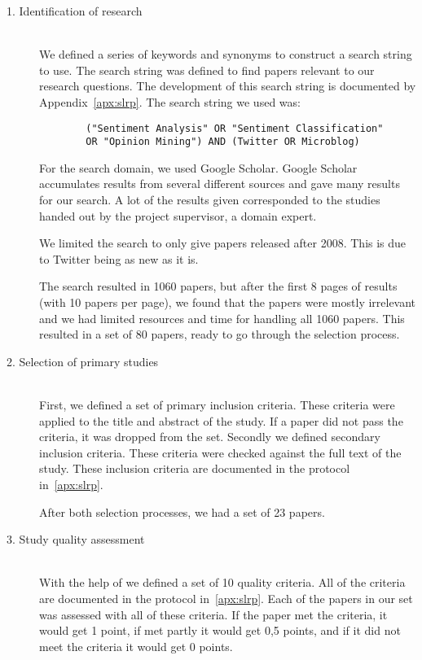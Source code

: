 \begin{description}

	\item[1. Identification of research] \hfill \\
		We defined a series of keywords and synonyms to construct a search string to use. The search string was defined to find papers relevant to our research questions. The development of this search string is documented by Appendix~\ref{apx:slrp}. The search string we used was:
		
		\begin{verbatim}
		("Sentiment Analysis" OR "Sentiment Classification" 
		OR "Opinion Mining") AND (Twitter OR Microblog)
		\end{verbatim}
		
		For the search domain, we used Google Scholar. Google Scholar accumulates results from several different sources and gave many results for our search. A lot of the results given corresponded to the studies handed out by the project supervisor, a domain expert. 
		
		We limited the search to only give papers released after 2008. This is due to Twitter being as new as it is.
		
		The search resulted in 1060 papers, but after the first 8 pages of results (with 10 papers per page), we found that the papers were mostly irrelevant and we had limited resources and time for handling all 1060 papers. This resulted in a set of 80 papers, ready to go through the selection process.
		
		

	\item[2. Selection of primary studies] \hfill \\
		First, we defined a set of primary inclusion criteria. These criteria were applied to the title and abstract of the study. If a paper did not pass the criteria, it was dropped from the set. Secondly we defined secondary inclusion criteria. These criteria were checked against the full text of the study. These inclusion criteria are documented in the protocol in~\autoref{apx:slrp}. 
		
		After both selection processes, we had a set of 23 papers. 

	\item[3. Study quality assessment] \hfill \\
		With the help of \cite{paper:slrdesc} we defined a set of 10 quality criteria. All of the criteria are documented in the protocol in~\autoref{apx:slrp}. Each of the papers in our set was assessed with all of these criteria. If the paper met the criteria, it would get 1 point, if met partly it would get 0,5 points, and if it did not meet the criteria it would get 0 points. 
		

\end{description}
